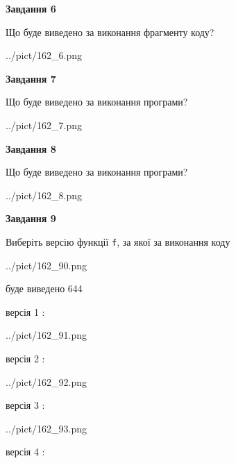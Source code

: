 \documentclass[12pt, ukrainian]{article}
\def\code#1{\Verb!#1!}
\begin{document}
{\begin {large}
{\begin {center}\textbf{Завдання 6}\end {center}}

Що буде виведено за виконання фрагменту коду?\par
\begin{center}
	{../pict/162_6.png}
\end{center}
\newpage

{\begin {center}\textbf{Завдання 7}\end {center}}

Що буде виведено за виконання програми?\par
\begin{center}
	{../pict/162_7.png}
\end{center}
\newpage

{\begin {center}\textbf{Завдання 8}\end {center}}

Що буде виведено за виконання програми?\par
\begin{center}
	{../pict/162_8.png}
\end{center}
\newpage

{\begin {center}\textbf{Завдання 9}\end {center}}

Виберіть версію функції \code{f}, за якої за виконання коду
\begin{center}
	{../pict/162_90.png}
\end{center}
буде виведено 644

\vspace{5mm}
версія 1 :

\begin{center}
	{../pict/162_91.png}
\end{center}
версія 2 :

\begin{center}
	{../pict/162_92.png}
\end{center}
версія 3 :

\begin{center}
	{../pict/162_93.png}
\end{center}
версія 4 :


\end{large}}
\end{document}
